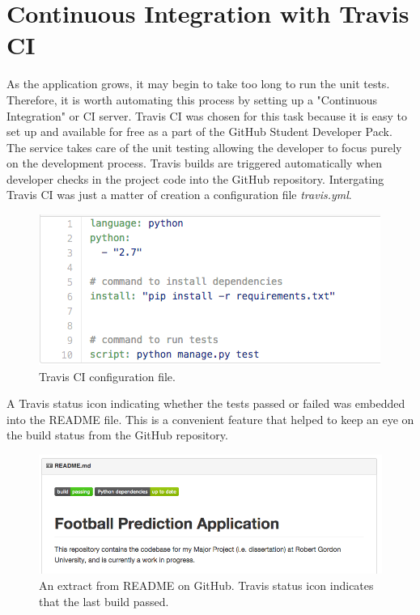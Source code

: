 \section{Continuous Integration with Travis CI}
\label{sec:travis_test}
As the application grows, it may begin to take too long to run the unit tests. Therefore, it is worth automating this process by setting up a "Continuous Integration" or CI server. Travis CI was chosen for this task because it is easy to set up and available for free as a part of the GitHub Student Developer Pack. 
The service takes care of the unit testing allowing the developer to focus purely on the development process. Travis builds are triggered automatically when developer checks in the project code into the GitHub repository. Intergating Travis CI was just a matter of creation a configuration file \emph{travis.yml}. 

\begin{figure}[H]
	\begin{center}
		\includegraphics[width=.60\textwidth]{testing/images/travisYml}
		\caption{Travis CI configuration file.} \label{fig:using:travisyml}
\end{center}
\end{figure}
	
A Travis status icon indicating whether the tests passed or failed was embedded into the README file. This is a convenient feature that helped to keep an eye on the build status from the GitHub repository.

\begin{figure}[H]
	\begin{center}
		\includegraphics[width=.90\linewidth,natwidth=610,natheight=642]{testing/images/travisBadge}
		\caption{An extract from README on GitHub. Travis status icon indicates that the last build passed.} \label{fig:using:travisbadge}
	\end{center}
\end{figure}

